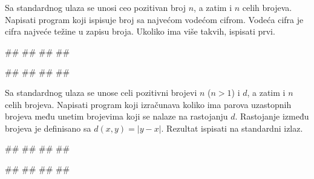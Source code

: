 \begin{Exercise}[label=p1.3_18] 
Sa standardnog ulaza se unosi ceo pozitivan broj $n$, a zatim i $n$
celih brojeva. Napisati program koji ispisuje broj sa najvećom vodećom
cifrom. Vodeća cifra je cifra najveće težine u zapisu broja. Ukoliko ima više
takvih, ispisati prvi. 

\begin{miditest}
\begin{upotreba}{1}
#\naslovInt#
##
##
##
\end{upotreba}
\end{miditest}
\begin{miditest}
\begin{upotreba}{1}
#\naslovInt#
##
##
##
\end{upotreba}
\end{miditest}
\end{Exercise}
\begin{Answer}[ref=p1.3_18]
\end{Answer}


\begin{Exercise}[label=p1.3_19] 
Sa standardnog ulaza se unose celi pozitivni brojevi $n$ ($n>1$) i
$d$, a zatim i $n$ celih brojeva. Napisati program koji izračunava
koliko ima parova uzastopnih brojeva među unetim brojevima koji se
nalaze na rastojanju $d$. Rastojanje između brojeva je definisano sa
$d(x,y)=|y-x|$. Rezultat ispisati na standardni izlaz. 

\begin{miditest}
\begin{upotreba}{1}
#\naslovInt#
##
##
##
\end{upotreba}
\end{miditest}
\begin{miditest}
\begin{upotreba}{2}
#\naslovInt#
##
##
##
\end{upotreba}
\end{miditest}
\end{Exercise}
\begin{Answer}[ref=p1.3_19]
\end{Answer}


